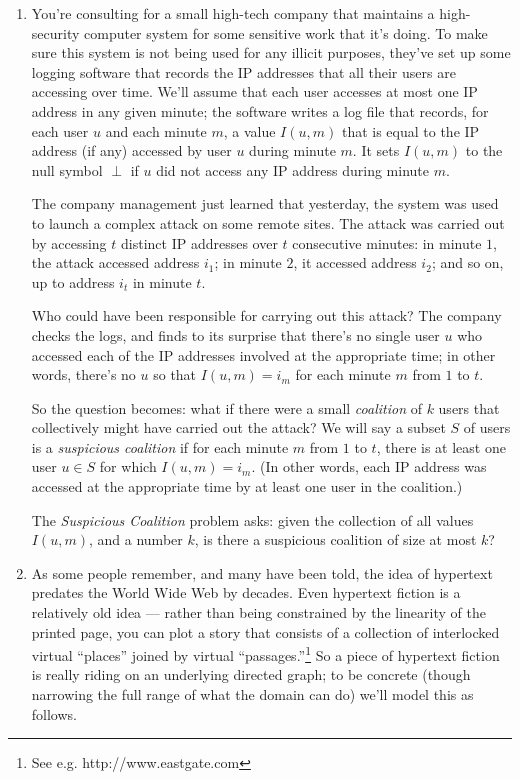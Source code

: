 \documentclass[12pt]{article}
\begin{document}
\begin{enumerate}
\item 

You're consulting for a small high-tech company that
maintains a high-security computer system for some
sensitive work that it's doing.
To make sure this system is not being used
for any illicit purposes, they've set up some logging
software that records the IP addresses that all their
users are accessing over time.
We'll assume that each user accesses at most one
IP address in any given minute;
the software writes a log file that records,
for each user $u$ and each minute $m$,
a value $I(u,m)$ that is equal to the IP address (if any)
accessed by user $u$ during minute $m$.
It sets $I(u,m)$ to the null symbol $\perp$
if $u$ did not access any IP address during minute $m$.

The company management just learned that yesterday, the system was used
to launch a complex attack on some remote sites.
The attack was carried out by accessing $t$ distinct
IP addresses over $t$ consecutive minutes:
in minute $1$, the attack accessed address $i_1$;
in minute $2$, it accessed address $i_2$;
and so on, up to address $i_t$ in minute $t$.

Who could have been responsible for carrying out this attack?
The company checks the logs, and finds to its surprise that
there's no single user $u$ who accessed each of the
IP addresses involved at the appropriate time;
in other words, there's no $u$ so that $I(u,m) = i_m$
for each minute $m$ from $1$ to $t$.

So the question becomes: what if there were a small
{\em coalition} of $k$ users that collectively might
have carried out the attack?
We will say a subset $S$ of users is a {\em suspicious coalition}
if for each minute $m$ from $1$ to $t$,
there is at least one user $u \in S$ for which $I(u,m) = i_m$.
(In other words, each IP address was accessed at the appropriate
time by at least one user in the coalition.)

The {\em Suspicious Coalition} problem asks:
given the collection of all values $I(u,m)$,
and a number $k$,
is there a suspicious coalition of size at most $k$?




\item 

As some people remember, and many have been told,
the idea of hypertext predates the World Wide Web
by decades.
Even hypertext fiction is a relatively old idea ---
rather than being constrained by the linearity of the printed page,
you can plot a story that consists of a collection
of interlocked virtual ``places''
joined by virtual ``passages.''\footnote{See
e.g. http://www.eastgate.com}
So a piece of hypertext fiction is really riding on
an underlying directed graph; to be concrete
(though narrowing the full range of what the domain can do)
we'll model this as follows.


\end{enumerate}
\end{document}
